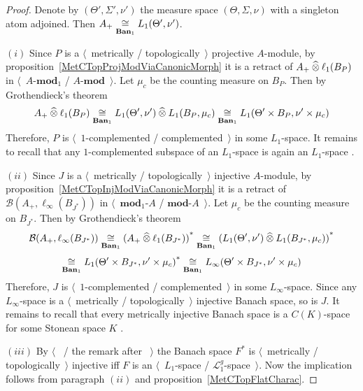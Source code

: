 \begin{proof} 

Denote by $(\Theta',\Sigma',\nu')$ the measure space $(\Theta,\Sigma,\nu)$ with
a singleton atom adjoined. Then $A_+\mathrel{\mathop{\cong}\limits_{\mathbf{Ban}_1}} L_1(\Theta',\nu')$.

$(i)$ Since $P$ is a $\langle$~metrically / topologically~$\rangle$ projective
$A$-module, by proposition~\ref{MetCTopProjModViaCanonicMorph} it is a
retract of $A_+\mathbin{\widehat{\otimes}} \ell_1(B_P)$ in $\langle$~$A\text{-}\mathbf{mod}_1$ /
$A\text{-}\mathbf{mod}$~$\rangle$. Let $\mu_c$ be the counting measure on $B_P$. Then
by Grothendieck's theorem \cite[theorem 2.7.5]{HelLectAndExOnFuncAn}
\[
A_+\mathbin{\widehat{\otimes}}\ell_1(B_P)
\mathrel{\mathop{\cong}\limits_{\mathbf{Ban}_1}}L_1(\Theta',\nu')\mathbin{\widehat{\otimes}} L_1(B_P,\mu_c)
\mathrel{\mathop{\cong}\limits_{\mathbf{Ban}_1}}L_1(\Theta'\times B_P,\nu'\times \mu_c)
\]
Therefore, $P$ is $\langle$~$1$-complemented / complemented~$\rangle$ in some
$L_1$-space. It remains to recall that any $1$-complemented subspace of
an $L_1$-space is again an $L_1$-space \cite[theorem 6.17.3]{LaceyIsomThOfClassicBanSp}.

$(ii)$ Since $J$ is a $\langle$~metrically / topologically~$\rangle$ injective
$A$-module, by proposition~\ref{MetCTopInjModViaCanonicMorph} it is a
retract of $\mathcal{B}(A_+,\ell_\infty(B_{J^*}))$ in
$\langle$~$\mathbf{mod}_1\text{-}A$ / $\mathbf{mod}\text{-}A$~$\rangle$. Let $\mu_c$ be the
counting measure on $B_{J^*}$. Then by Grothendieck's theorem
\cite[theorem 2.7.5]{HelLectAndExOnFuncAn}
\[
\mathcal{B}(A_+,\ell_\infty(B_{J^*}))
\mathrel{\mathop{\cong}\limits_{\mathbf{Ban}_1}}
{(A_+\mathbin{\widehat{\otimes}} \ell_1(B_{J^*}))}^*
\mathrel{\mathop{\cong}\limits_{\mathbf{Ban}_1}}
{(L_1(\Theta',\nu')\mathbin{\widehat{\otimes}} L_1(B_{J^*},\mu_c))}^*
\]
\[
\mathrel{\mathop{\cong}\limits_{\mathbf{Ban}_1}}{L_1(\Theta'\times B_{J^*},\nu'\times \mu_c)}^*
\mathrel{\mathop{\cong}\limits_{\mathbf{Ban}_1}}L_\infty(\Theta'\times B_{J^*},\nu'\times \mu_c)
\]
Therefore, $J$ is $\langle$~$1$-complemented / complemented~$\rangle$ in some
$L_\infty$-space. Since any $L_\infty$-space is a $\langle$~metrically /
topologically~$\rangle$ injective Banach space, so is $J$. It remains to
recall that every metrically injective Banach space is a $C(K)$-space for some
Stonean space $K$ \cite[theorem 3.11.6]{LaceyIsomThOfClassicBanSp}.

$(iii)$  By $\langle$~\cite[theorem 1]{GrothMetrProjFlatBanSp} / the remark after
\cite[corollary 23.5(1)]{DefFloTensNorOpId}~$\rangle$ the Banach space $F^*$
is $\langle$~metrically / topologically~$\rangle$ injective iff $F$ is an
$\langle$~$L_1$-space / $\mathscr{L}_1^g$-space~$\rangle$. Now the implication
follows from paragraph $(ii)$ and proposition~\ref{MetCTopFlatCharac}.
\end{proof}

